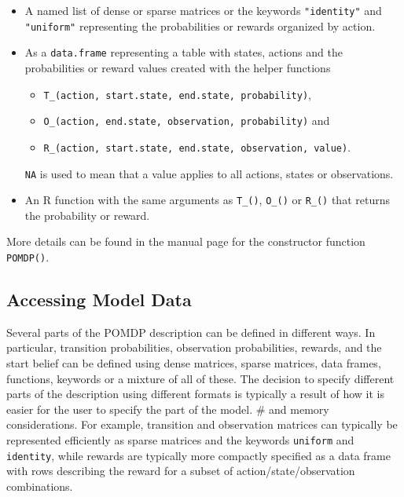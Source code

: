 \begin{itemize}
\item
  A named list of dense or sparse matrices or the keywords \texttt{"identity"} and \texttt{"uniform"} representing the
  probabilities or rewards organized by action.
\item
  As a \texttt{data.frame} representing a table with states, actions and the probabilities or reward values created with the helper functions

  \begin{itemize}
  \tightlist
  \item
    \texttt{T\_(action,\ start.state,\ end.state,\ probability)},
  \item
    \texttt{O\_(action,\ end.state,\ observation,\ probability)} and
  \item
    \texttt{R\_(action,\ start.state,\ end.state,\ observation,\ value)}.
  \end{itemize}

  \texttt{NA} is used to mean that a value applies to all actions, states or observations.
\item
  An R function with the same arguments as \texttt{T\_()}, \texttt{O\_()} or \texttt{R\_()} that
  returns the probability or reward.
\end{itemize}

More details can be found in the manual page for the constructor function \texttt{POMDP()}.

\hypertarget{accessing-model-data}{%
\subsection{Accessing Model Data}\label{accessing-model-data}}

Several parts of the POMDP description can be defined in different ways. In particular, transition probabilities, observation
probabilities, rewards, and the start belief can be defined using dense matrices, sparse matrices, data frames, functions, keywords or a mixture of all of these. The decision to specify different parts of the description using different formats is
typically a result of how it is easier for the user to specify the part of the model.
\# and memory considerations.
For example, transition and observation matrices can typically be represented efficiently as sparse matrices and the keywords \texttt{uniform} and \texttt{identity}, while rewards are typically more compactly specified as a data frame with rows describing the reward for
a subset of action/state/observation combinations.

